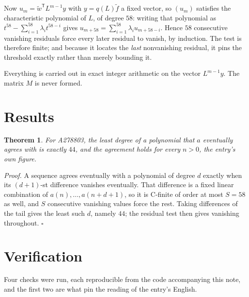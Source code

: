 \documentclass[11pt]{article}
\newtheorem{theorem}{Theorem}
\theoremstyle{definition}
\begin{document}
Now $u_m = \tilde w^{\mathsf T} L^{m-1} y$ with $y = q(L)\tilde f$ a fixed vector, so $(u_m)$ satisfies the characteristic polynomial of $L$, of degree $58$: writing that polynomial as $t^{58} - \sum_{i=1}^{58} \lambda_i t^{58-i}$ gives $u_{m+58} = \sum_{i=1}^{58} \lambda_i u_{m+58-i}$. Hence $58$ consecutive vanishing residuals force every later residual to vanish, by induction. The test is therefore finite; and because it locates the {\itshape last} nonvanishing residual, it pins the threshold exactly rather than merely bounding it.

Everything is carried out in exact integer arithmetic on the vector $L^{m-1}y$. The matrix $M$ is never formed.

\section{Results}

\begin{theorem} For A278803, the least degree of a polynomial that $a$ eventually agrees with is exactly $44$, and the agreement holds for every $n > 0$, the entry's own figure.\end{theorem}

{\itshape Proof.} A sequence agrees eventually with a polynomial of degree $d$ exactly when its $(d+1)$-st difference vanishes eventually. That difference is a fixed linear combination of $a(n),\dots,a(n+d+1)$, so it is C-finite of order at most $S = 58$ as well, and $S$ consecutive vanishing values force the rest. Taking differences of the tail gives the least such $d$, namely $44$; the residual test then gives vanishing throughout. $\square$

\section{Verification}

Four checks were run, each reproducible from the code accompanying this note, and the first two are what pin the reading of the entry's English.
\end{document}
